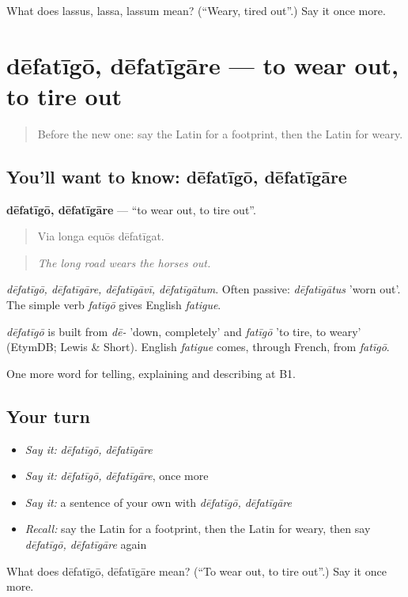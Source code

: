 \begin{tcolorbox}[breakable,colback=teal!4,colframe=teal!35!black,title={Before you move on}]
What does lassus, lassa, lassum mean? (\textquotedblleft{}Weary, tired out\textquotedblright{}.) Say it once more.
\end{tcolorbox}
\section[dēfatīgō, dēfatīgāre]{dēfatīgō, dēfatīgāre — to wear out, to tire out}

\label{lesson:LA-C426-defatigo}



\begin{quote}
Before the new one: say the Latin for a footprint, then the Latin for weary.
\end{quote}

\subsection*{You'll want to know: dēfatīgō, dēfatīgāre}
\textbf{dēfatīgō, dēfatīgāre} — \textquotedblleft{}to wear out, to tire out\textquotedblright{}.

\begin{quote}
Via longa equōs dēfatīgat.
\end{quote}

\begin{quote}
\emph{The long road wears the horses out.}
\end{quote}

\emph{dēfatīgō, dēfatīgāre, dēfatīgāvī, dēfatīgātum}. Often passive: \emph{dēfatīgātus} 'worn out'. The simple verb \emph{fatīgō} gives English \emph{fatigue}.

\begin{cousinweb}
\emph{dēfatīgō} is built from \emph{dē-} 'down, completely' and \emph{fatīgō} 'to tire, to weary' (EtymDB; Lewis \& Short). English \emph{fatigue} comes, through French, from \emph{fatīgō}.
\end{cousinweb}

\begin{grammarlens}[title={What you've built}]
One more word for telling, explaining and describing at B1.
\end{grammarlens}

\subsection*{Your turn}
\begin{itemize}
\raggedright
  \item \emph{Say it:} \emph{dēfatīgō, dēfatīgāre}
  \item \emph{Say it:} \emph{dēfatīgō, dēfatīgāre}, once more
  \item \emph{Say it:} a sentence of your own with \emph{dēfatīgō, dēfatīgāre}
  \item \emph{Recall:} say the Latin for a footprint, then the Latin for weary, then say \emph{dēfatīgō, dēfatīgāre} again
\end{itemize}

\begin{tcolorbox}[breakable,colback=teal!4,colframe=teal!35!black,title={Before you move on}]
What does dēfatīgō, dēfatīgāre mean? (\textquotedblleft{}To wear out, to tire out\textquotedblright{}.) Say it once more.
\end{tcolorbox}
